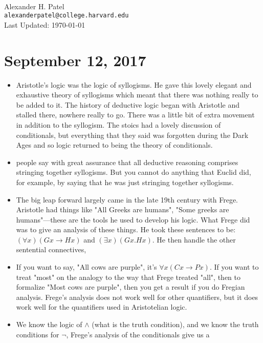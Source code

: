 \documentclass[12pt]{article}
\theoremstyle{definition}
\begin{document}
\begin{center}
\textbf{} \\
Alexander H. Patel \\
{\tt alexanderpatel@college.harvard.edu} \\
Last Updated: \today
\end{center}

\tableofcontents

\section{September 12, 2017}

\begin{itemize}
\itemsep0em 
\item Aristotle's logic was the logic of syllogisms. He gave this lovely
elegant and exhaustive theory of syllogisms which meant that there was nothing
really to be added to it. The history of deductive logic began with Aristotle
and stalled there, nowhere really to go. There was a little bit of extra
movement in addition to the syllogism. The stoics had a lovely discussion of
conditionals, but everything that they said was forgotten during the Dark Ages
and so logic returned to being the theory of conditionals.
\item people say with great assurance that all deductive reasoning comprises
stringing together syllogisms. But you cannot do anything that Euclid did, for
example, by saying that he was just stringing together syllogisms.
\item The big leap forward largely came in the late 19th century with Frege.
Aristotle  had things like "All Greeks are humans", "Some greeks are
humans"---these are the tools he used to develop his logic. What Frege did was
to give an analysis of these things. He took these sentences to be: $(\forall
x) (Gx \rightarrow Hx)$ and $(\exists x)(Gx. Hx)$. He then handle the other
sentential connectives,
\item If you want to say, "All cows are purple", it's $\forall x (Cx
\rightarrow Px)$. If you want to treat "most" on the analogy to the way that
Frege treated "all", then to formalize "Most cows are purple", then you get a
result if you do Fregian analysis. Frege's analysis does not work well for
other quantifiers, but it does work well for the quantifiers used in
Aristotelian logic.
\item We know the logic of $\wedge$ (what is the truth condition), and we know
the truth conditions for $\neg$, Frege's analysis of the conditionals give us a

\end{itemize}
\end{document}
